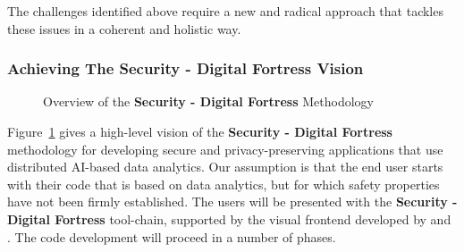 \documentclass[a4paper,11pt]{article}
\newcommand{\project}[1]{\textbf{#1}\xspace}
\newcommand{\SECURITY}{\project{Security - Digital Fortress}}
\newcommand{\TheProject}{\SECURITY}
\begin{document}
The challenges identified above require a new and radical
approach that tackles these issues in a coherent and
holistic way. 

\subsubsection{Achieving The \TheProject{} Vision}

\begin{figure}[tp]
  \begin{center}
  \vspace{-5mm}
  \caption{Overview of the \TheProject{} Methodology}
  \label{fig:overview}
  \end{center}
  \end{figure}

Figure~\ref{fig:overview} gives a high-level vision of the \TheProject{} methodology for developing secure and privacy-preserving applications that use distributed AI-based data analytics. Our assumption is that the end user starts with their code that is based on data analytics, but for which safety properties have not been firmly established. The users will be presented with the \TheProject{} tool-chain, supported by the visual frontend developed by \USTANshort{} and \YAGshort{}. The code development will proceed in a number of phases.
\end{document}

